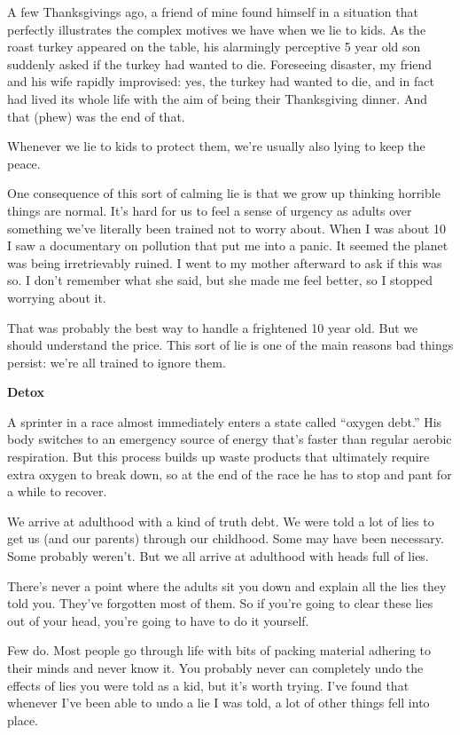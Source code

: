 A few Thanksgivings ago, a friend of mine found himself in a situation
that perfectly illustrates the complex motives we have when we lie to
kids. As the roast turkey appeared on the table, his alarmingly
perceptive 5 year old son suddenly asked if the turkey had wanted to
die. Foreseeing disaster, my friend and his wife rapidly improvised:
yes, the turkey had wanted to die, and in fact had lived its whole life
with the aim of being their Thanksgiving dinner. And that (phew) was the
end of that.

Whenever we lie to kids to protect them, we're usually also lying to
keep the peace.

One consequence of this sort of calming lie is that we grow up thinking
horrible things are normal. It's hard for us to feel a sense of urgency
as adults over something we've literally been trained not to worry
about. When I was about 10 I saw a documentary on pollution that put me
into a panic. It seemed the planet was being irretrievably ruined. I
went to my mother afterward to ask if this was so. I don't remember what
she said, but she made me feel better, so I stopped worrying about it.

That was probably the best way to handle a frightened 10 year old. But
we should understand the price. This sort of lie is one of the main
reasons bad things persist: we're all trained to ignore them.

\textbf{Detox}

A sprinter in a race almost immediately enters a state called ``oxygen
debt.'' His body switches to an emergency source of energy that's faster
than regular aerobic respiration. But this process builds up waste
products that ultimately require extra oxygen to break down, so at the
end of the race he has to stop and pant for a while to recover.

We arrive at adulthood with a kind of truth debt. We were told a lot of
lies to get us (and our parents) through our childhood. Some may have
been necessary. Some probably weren't. But we all arrive at adulthood
with heads full of lies.

There's never a point where the adults sit you down and explain all the
lies they told you. They've forgotten most of them. So if you're going
to clear these lies out of your head, you're going to have to do it
yourself.

Few do. Most people go through life with bits of packing material
adhering to their minds and never know it. You probably never can
completely undo the effects of lies you were told as a kid, but it's
worth trying. I've found that whenever I've been able to undo a lie I
was told, a lot of other things fell into place.

